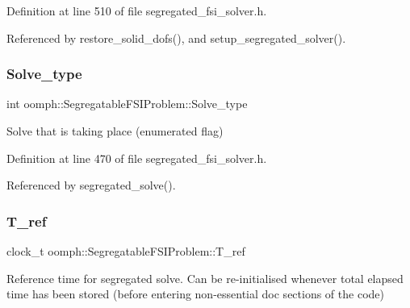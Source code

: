 Definition at line 510 of file segregated\+\_\+fsi\+\_\+solver.\+h.



Referenced by restore\+\_\+solid\+\_\+dofs(), and setup\+\_\+segregated\+\_\+solver().

\mbox{\label{classoomph_1_1SegregatableFSIProblem_af238c6f11f6d4aacd2ff6e0dea917d40}} 
\subsubsection{\texorpdfstring{Solve\+\_\+type}{Solve\_type}}
{\footnotesize\ttfamily int oomph\+::\+Segregatable\+F\+S\+I\+Problem\+::\+Solve\+\_\+type\hspace{0.3cm}{\ttfamily [protected]}}



Solve that is taking place (enumerated flag) 



Definition at line 470 of file segregated\+\_\+fsi\+\_\+solver.\+h.



Referenced by segregated\+\_\+solve().

\mbox{\label{classoomph_1_1SegregatableFSIProblem_a814254917e5cedc6fce1793168124beb}} 
\subsubsection{\texorpdfstring{T\+\_\+ref}{T\_ref}}
{\footnotesize\ttfamily clock\+\_\+t oomph\+::\+Segregatable\+F\+S\+I\+Problem\+::\+T\+\_\+ref\hspace{0.3cm}{\ttfamily [private]}}



Reference time for segregated solve. Can be re-\/initialised whenever total elapsed time has been stored (before entering non-\/essential doc sections of the code) 



